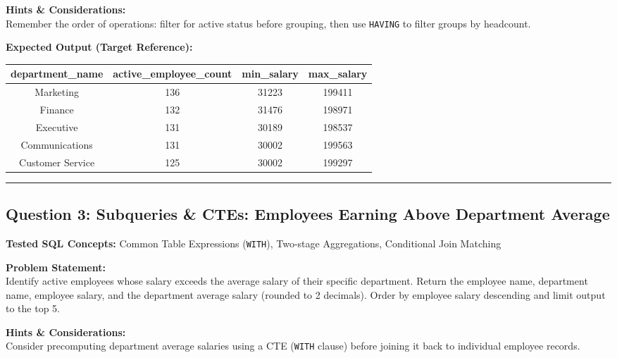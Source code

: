 \documentclass[11pt,a4paper]{article}
\begin{document}
\vspace{0.2cm}
\noindent\textbf{Hints \& Considerations:} \\
Remember the order of operations: filter for active status before grouping, then use \texttt{HAVING} to filter groups by headcount.

\vspace{0.3cm}
\noindent\textbf{Expected Output (Target Reference):}
\begin{center}
\small
\begin{tabular}{cccc}
\toprule
\textbf{department\_name} & \textbf{active\_employee\_count} & \textbf{min\_salary} & \textbf{max\_salary} \\
\midrule
Marketing & 136 & 31223 & 199411 \\
Finance & 132 & 31476 & 198971 \\
Executive & 131 & 30189 & 198537 \\
Communications & 131 & 30002 & 199563 \\
Customer Service & 125 & 30002 & 199297 \\
\bottomrule
\end{tabular}
\end{center}

\vspace{0.4cm}
\noindent\rule{\textwidth}{0.4pt}
\vspace{0.4cm}

\subsection*{Question 3: Subqueries & CTEs: Employees Earning Above Department Average}

\noindent\textbf{Tested SQL Concepts:} Common Table Expressions (\texttt{WITH}), Two-stage Aggregations, Conditional Join Matching

\vspace{0.15cm}
\noindent\textbf{Problem Statement:} \\
Identify active employees whose salary exceeds the average salary of their specific department. Return the employee name, department name, employee salary, and the department average salary (rounded to 2 decimals). Order by employee salary descending and limit output to the top 5.

\vspace{0.2cm}
\noindent\textbf{Hints \& Considerations:} \\
Consider precomputing department average salaries using a CTE (\texttt{WITH} clause) before joining it back to individual employee records.
\end{document}
